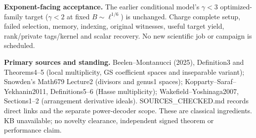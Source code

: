 \documentclass[10pt]{article}
\begin{document}
\textbf{Exponent-facing acceptance.}
The earlier conditional model's $\gamma<3$ optimized-family target
($\gamma<2$ at fixed $B\sim\ell^{1/6}$) is unchanged. Charge complete
setup, failed selection, memory, indexing, original witnesses, useful
target yield, rank/private tags/kernel and scalar recovery. No new
scientific job or campaign is scheduled.

\textbf{Primary sources and standing.}
Beelen--Montanucci (2025), Definition3 and
Theorems4--5 (local multiplicity, GS coefficient spaces and inseparable
variant); Snowden's Math679 Lecture2 (divisors and genus1 spaces);
Kopparty--Saraf--Yekhanin2011, Definitions5--6 (Hasse multiplicity);
Wakefield--Yoshinaga2007, Sections1--2 (arrangement derivative ideals).
SOURCES\_CHECKED.md records direct links and the separate power-decoder
scope. These are classical ingredients. KB unavailable; no novelty
clearance, independent signed theorem or performance claim.
\end{document}
